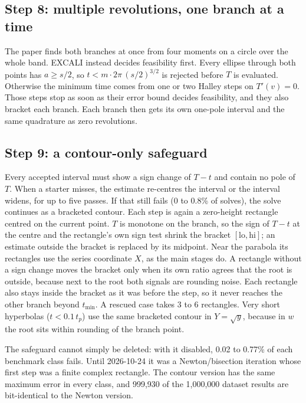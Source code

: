 \documentclass[11pt]{article}
\begin{document}
\subsection*{Step 8: multiple revolutions, one branch at a time}
The paper finds both branches at once from four moments on a circle over the whole band. EXCALI instead decides feasibility first. Every ellipse through both points has $a \ge s/2$, so $t < m\cdot2\pi\,(s/2)^{3/2}$ is rejected before $T$ is evaluated. Otherwise the minimum time comes from one or two Halley steps on $T'(v)=0$. Those steps stop as soon as their error bound decides feasibility, and they also bracket each branch. Each branch then gets its own one-pole interval and the same quadrature as zero revolutions.

\subsection*{Step 9: a contour-only safeguard}
Every accepted interval must show a sign change of $T-t$ and contain no pole of $T$. When a starter misses, the estimate re-centres the interval or the interval widens, for up to five passes. If that still fails (0 to 0.8\% of solves), the solve continues as a bracketed contour. Each step is again a zero-height rectangle centred on the current point. $T$ is monotone on the branch, so the sign of $T-t$ at the centre and the rectangle's own sign test shrink the bracket $[\text{lo},\text{hi}]$; an estimate outside the bracket is replaced by its midpoint. Near the parabola its rectangles use the series coordinate $X$, as the main stages do. A rectangle without a sign change moves the bracket only when its own ratio agrees that the root is outside, because next to the root both signals are rounding noise. Each rectangle also stays inside the bracket as it was before the step, so it never reaches the other branch beyond $t_\text{min}$. A rescued case takes 3 to 6 rectangles. Very short hyperbolas ($t<0.1\,t_p$) use the same bracketed contour in $Y=\sqrt{y}$, because in $w$ the root sits within rounding of the branch point.

The safeguard cannot simply be deleted: with it disabled, 0.02 to 0.77\% of each benchmark class fails. Until 2026-10-24 it was a Newton/bisection iteration whose first step was a finite complex rectangle. The contour version has the same maximum error in every class, and 999,930 of the 1,000,000 dataset results are bit-identical to the Newton version.
\end{document}
